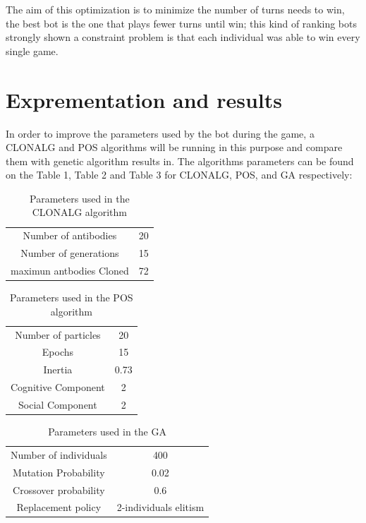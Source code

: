 \documentclass[]{interact}
\theoremstyle{plain}%
\theoremstyle{definition}
\theoremstyle{remark}
\begin{document}
The aim of this optimization is to minimize the number of turns needs to win, the best bot is the one that plays fewer turns until win; this kind of ranking bots strongly shown a constraint problem is that each individual was able to win every single game.

\section{Exprementation and results}
In order to improve the parameters used by the bot during the game, a CLONALG and POS algorithms will be running in this purpose and compare them with genetic algorithm results in\cite{doc1}. The algorithms parameters can be found on the Table 1, Table 2 and Table 3 for CLONALG, POS, and GA respectively:
\begin{table}[h!]
\centering
\begin{tabular}{ |c|c| }
\hline
 Number of antibodies & 20 \\ 
 Number of generations & 15 \\  
 maximun antbodies Cloned & 72 \\ 
 \hline   
\end{tabular}
\centering
\caption{Parameters used in the CLONALG algorithm}
\label{TABLE 1}
\end{table}

\begin{table}[h!]
\centering
\begin{tabular}{ |c|c| }
\hline
 Number of particles & 20 \\ 
 Epochs & 15 \\  
 Inertia & 0.73 \\
 Cognitive Component & 2 \\
 Social Component & 2 \\ 
 \hline   
\end{tabular}
\caption{Parameters used in the POS algorithm}
\label{TABLE 2}
\end{table}

\begin{table}[h!]
\centering
\begin{tabular}{ |c|c| }
\hline
 Number of individuals & 400 \\ 
 Mutation Probability & 0.02 \\  
 Crossover probability & 0.6 \\
 Replacement policy & 2-individuals elitism \\
 \hline   
\end{tabular}
\caption{Parameters used in the GA}
\label{TABLE 3}
\end{table}
\end{document}
